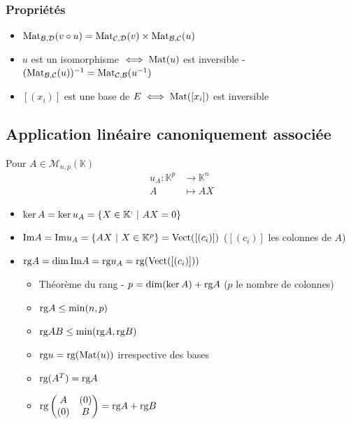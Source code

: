 \documentclass[openany]{book}
\begin{document}
\subsubsection{Propriétés}
\begin{itemize}
    \item $ \text{Mat}_{\mathcal{B}, \mathcal{D}}(v \circ u) = \text{Mat}_{\mathcal{C}, \mathcal{D}}(v) \times \text{Mat}_{\mathcal{B}, \mathcal{C}}(u) $
    \item $u$ est un isomorphisme $\iff \text{Mat} (u)$ est inversible - $ (\text{Mat}_{\mathcal{B, C}}(u))^{-1} = \text{Mat}_{\mathcal{C, B}}(u^{-1}) $
    \item $ [(x_i)] $ est une base de $E \iff \text{Mat} ([x_i]) $ est inversible 
\end{itemize}

\subsection{Application linéaire canoniquement associée}
Pour $A \in \mathcal{M}_{n, p}(\mathbb{K})$
\begin{align*}
    u_A : \mathbb{K}^p & \rightarrow \mathbb{K}^n \\
    A & \mapsto AX
\end{align*}

\begin{itemize}
    \item $ \ker A = \ker u_A = \{X \in \mathbb{K^p} \text{ } | \text{ } AX = 0\} $
    \item $ \text{Im} A = \text{Im} u_A = \{AX \text{ } | \text{ } X \in \mathbb{K}^p\} = \text{Vect}([(c_i)]) $  ($[(c_i)]$ les colonnes de $A$)
    \item $ \text{rg} A = \dim \text{Im} A = \text{rg} u_A = \text{rg} (\text{Vect}([(c_i)])) $
    \begin{itemize}
        \item Théorème du rang - $p = \dim(\ker A) + \text{rg} A$ ($p$ le nombre de colonnes)
        \item $\text{rg} A \leq \min(n, p)$
        \item $\text{rg} AB \leq \min(\text{rg} A, \text{rg} B)$
        \item $\text{rg} u = \text{rg} (\text{Mat} (u))$ irrespective des bases
        \item $\text{rg}(A^T) = \text{rg} A$
        \item $ \text{rg} \begin{pmatrix}
            A & (0) \\
            (0) & B
        \end{pmatrix} = \text{rg} A + \text{rg} B $
    \end{itemize}
\end{itemize}
\end{document}
